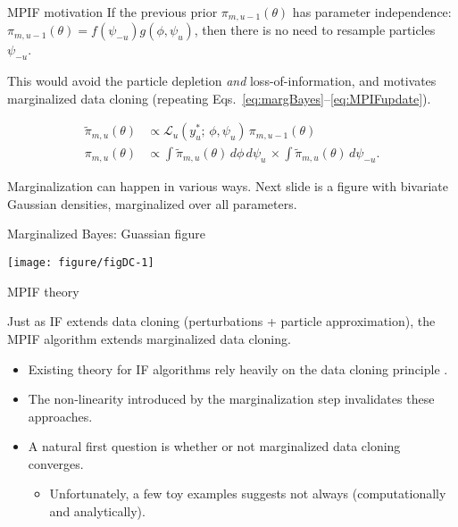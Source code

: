 \documentclass[aspectratio=169]{beamer}\usepackage[]{graphicx}\usepackage[]{xcolor}
\makeatletter
\def\maxwidth{ %
  \ifdim\Gin@nat@width>\linewidth
    \linewidth
  \else
    \Gin@nat@width
  \fi
}
\newenvironment{knitrout}{}{} %
\makeatother
\begin{document}
\begin{frame}{MPIF motivation}
  If the previous prior $\pi_{m, u-1}(\theta)$ has parameter independence: $\pi_{m, u-1}(\theta) = f(\psi_{-u})g(\phi, \psi_{u})$, then there is no need to resample particles $\psi_{-u}$. 
  
  This would avoid the particle depletion \emph{and} loss-of-information, and motivates marginalized data cloning (repeating Eqs.~\ref{eq:margBayes}--\ref{eq:MPIFupdate}).
  
  \begin{align}
\tilde{\pi}_{m, u}(\theta) &\propto \mathcal{L}_{u}(y^*_u;\, \phi, \psi_u)\, \pi_{m, u-1}(\theta) \label{eq:margBayes}\\
\pi_{m, u}(\theta) &\propto \int \! \tilde{\pi}_{m, u}(\theta) \, d\phi \, d\psi_u \, \times \int \! \tilde{\pi}_{m, u}(\theta) \, d\psi_{-u} \label{eq:MPIFupdate}.
\end{align}\pause

Marginalization can happen in various ways. Next slide is a figure with bivariate Gaussian densities, marginalized over all parameters. 

\end{frame}

\begin{frame}{Marginalized Bayes: Guassian figure}

\begin{knitrout}
\color{fgcolor}

{\centering \texttt{[image: figure/figDC-1]} 

}


\end{knitrout}

\end{frame}

\begin{frame}{MPIF theory}

  Just as IF extends data cloning (perturbations + particle approximation), the MPIF algorithm extends marginalized data cloning. 

  \begin{itemize}
    \item Existing theory for IF algorithms rely heavily on the data cloning principle \cite{ionides15, chen24}.
    \item The non-linearity introduced by the marginalization step invalidates these approaches.
    \item A natural first question is whether or not marginalized data cloning converges.
    \begin{itemize}
      \item Unfortunately, a few toy examples suggests not always (computationally and analytically).
    \end{itemize}
  \end{itemize}
  
\end{frame}
\end{document}
